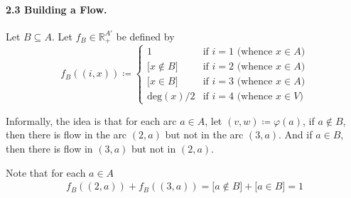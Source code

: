 \documentclass[a4paper,10pt, leqno]{article}
\theoremstyle{definition}
\begin{document}
\paragraph{2.3 Building a Flow.}
Let $B \subseteq A$. Let $f_B \in \mathbb{R}_+^{A'}$ be defined by
$$
f_B((i, x)) \coloneqq
\left\{
	\begin{array}{ll}
		1 & \mbox{if } i = 1 \text{ (whence } x \in A)\\
		\lbrack x \notin B \rbrack & \mbox{if } i = 2 \text{ (whence } x \in A)\\
		\lbrack x \in B \rbrack & \mbox{if } i = 3 \text{ (whence } x \in A)\\
		\text{deg}(x)/2 & \mbox{if } i = 4 \text{ (whence } x \in V)
	\end{array}
\right.
$$

Informally, the idea is that for each arc $a \in A$, let $(v, w) \coloneqq \varphi(a)$, if $a \notin B$, then there is flow in the arc $(2, a)$ but not in the arc $(3, a)$. And if $a \in B$, then there is flow in $(3, a)$ but not in $(2, a)$.

Note that for each $a \in A$
\begin{align*}
\tag{2.6}
 f_B((2, a)) + f_B((3, a)) = \lbrack a \notin B \rbrack + \lbrack a \in B \rbrack = 1
\end{align*}
\end{document}
